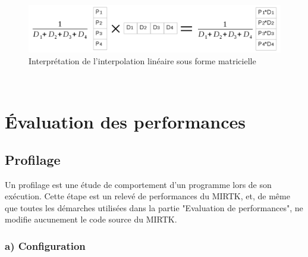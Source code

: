 \documentclass[10pt]{report}
\begin{document}
	\begin{figure}[h!]
		\begin{center}
			\includegraphics[width=16cm]{calcul_interp_lineaire.png}	
		\end{center}
		\caption{Interprétation de l'interpolation linéaire sous forme matricielle}
		\label{Interprétation de l'interpolation linéaire sous forme matricielle}
	\end{figure}
	~\par 

	\section{Évaluation des performances}
		\subsection{Profilage}
Un profilage est une étude de comportement d'un programme lors de son exécution. Cette étape est un relevé de performances du MIRTK, et, de même que toutes les démarches utilisées dans la partie "Evaluation de performances", ne modifie aucunement le code source du MIRTK. 
\subsubsection{a) Configuration}
\end{document}
